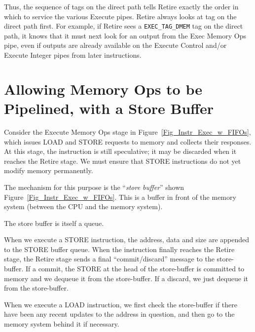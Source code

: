 Thus, the sequence of tags on the direct path tells Retire exactly the
order in which to service the various Execute pipes.  Retire always
looks at tag on the direct path first.  For example, if Retire sees a
\verb|EXEC_TAG_DMEM| tag on the direct path, it knows that it must
next look for an output from the Exec Memory Ops pipe, even if outputs
are already available on the Execute Control and/or Execute Integer
pipes from later instructions.


\section{Allowing Memory Ops to be Pipelined, with a Store Buffer}

\label{Sec_Store_Buffers}


Consider the Execute Memory Ops stage in
Figure~\ref{Fig_Instr_Exec_w_FIFOs}, which issues LOAD and STORE
requests to memory and collects their responses.  At this stage, the
instruction is still speculative; it may be discarded when it reaches
the Retire stage.  We must ensure that STORE instructions do not yet
modify memory permanently.

The mechanism for this purpose is the ``\emph{store buffer}'' shown
Figure~\ref{Fig_Instr_Exec_w_FIFOs}.  This is a buffer in front of the
memory system (between the CPU and the memory system).

\begin{tightlist}

 \item The store buffer is itself a queue.

 \item When we execute a STORE instruction, the address, data and size
       are appended to the STORE buffer queue.  When the instruction
       finally reaches the Retire stage, the Retire stage sends a
       final ``commit/discard'' message to the store-buffer.  If a
       commit, the STORE at the head of the store-buffer is committed
       to memory and we dequeue it from the store-buffer.  If a
       discard, we just dequeue it from the store-buffer.

 \item When we execute a LOAD instruction, we first check the
       store-buffer if there have been any recent updates to the
       address in question, and then go to the memory system behind it
       if necessary.

\end{tightlist}

